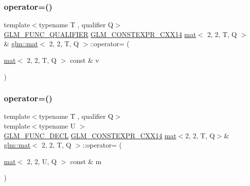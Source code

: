 \subsubsection{\texorpdfstring{operator=()}{operator=()}\hspace{0.1cm}{\footnotesize\ttfamily [1/3]}}
{\footnotesize\ttfamily template$<$typename T , qualifier Q$>$ \\
\hyperlink{setup_8hpp_a33fdea6f91c5f834105f7415e2a64407}{G\+L\+M\+\_\+\+F\+U\+N\+C\+\_\+\+Q\+U\+A\+L\+I\+F\+I\+ER} \hyperlink{setup_8hpp_a4dd12abf5e1164bc57f3a34671d03844}{G\+L\+M\+\_\+\+C\+O\+N\+S\+T\+E\+X\+P\+R\+\_\+\+C\+X\+X14} \hyperlink{structglm_1_1mat}{mat}$<$ 2, 2, T, Q $>$ \& \hyperlink{structglm_1_1mat}{glm\+::mat}$<$ 2, 2, T, Q $>$\+::operator= (\begin{DoxyParamCaption}\item[{\hyperlink{structglm_1_1mat}{mat}$<$ 2, 2, T, Q $>$ const \&}]{v }\end{DoxyParamCaption})}

\mbox{\label{structglm_1_1mat_3_012_00_012_00_01_t_00_01_q_01_4_a5b25b3f234873c4246a76fa03f7c83ef}} 
\subsubsection{\texorpdfstring{operator=()}{operator=()}\hspace{0.1cm}{\footnotesize\ttfamily [2/3]}}
{\footnotesize\ttfamily template$<$typename T , qualifier Q$>$ \\
template$<$typename U $>$ \\
\hyperlink{setup_8hpp_ab2d052de21a70539923e9bcbf6e83a51}{G\+L\+M\+\_\+\+F\+U\+N\+C\+\_\+\+D\+E\+CL} \hyperlink{setup_8hpp_a4dd12abf5e1164bc57f3a34671d03844}{G\+L\+M\+\_\+\+C\+O\+N\+S\+T\+E\+X\+P\+R\+\_\+\+C\+X\+X14} \hyperlink{structglm_1_1mat}{mat}$<$2, 2, T, Q$>$\& \hyperlink{structglm_1_1mat}{glm\+::mat}$<$ 2, 2, T, Q $>$\+::operator= (\begin{DoxyParamCaption}\item[{\hyperlink{structglm_1_1mat}{mat}$<$ 2, 2, U, Q $>$ const \&}]{m }\end{DoxyParamCaption})}

\mbox{\label{structglm_1_1mat_3_012_00_012_00_01_t_00_01_q_01_4_a1819564bc86b8cc5a855482bdfcb88d7}} 
